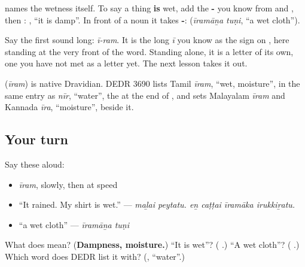 \textbf{} names the wetness itself. To say a thing \textbf{is} wet, add the \textbf{-} you know from \textbf{} and \textbf{}, then \textbf{}: \textbf{ }, \textquotedblleft{}it is damp\textquotedblright{}. In front of a noun it takes \textbf{-}: \textbf{ } (\emph{īramāṉa tuṇi}, \textquotedblleft{}a wet cloth\textquotedblright{}).

Say the first sound long: \emph{ī-ram}. It is the long \emph{ī} you know as the sign  on \textbf{}, here standing at the very front of the word. Standing alone, it is a letter of its own, one you have not met as a letter yet. The next lesson takes it out.

\begin{cousinweb}
\textbf{} (\emph{īram}) is native Dravidian. DEDR 3690 lists Tamil \emph{īram}, \textquotedblleft{}wet, moisture\textquotedblright{}, in the same entry as \emph{nīr}, \textquotedblleft{}water\textquotedblright{}, the \textbf{} at the end of \textbf{}, and sets Malayalam \emph{īram} and Kannada \emph{īra}, \textquotedblleft{}moisture\textquotedblright{}, beside it.
\end{cousinweb}

\subsection*{Your turn}
Say these aloud:

\begin{itemize}
\raggedright
  \item \emph{īram}, slowly, then at speed
  \item \textquotedblleft{}It rained. My shirt is wet.\textquotedblright{} — \emph{maḻai peytatu. eṉ caṭṭai īramāka irukkiṟatu.}
  \item \textquotedblleft{}a wet cloth\textquotedblright{} — \emph{īramāṉa tuṇi}
\end{itemize}

\begin{tcolorbox}[breakable,colback=teal!4,colframe=teal!35!black,title={Before you move on}]
What does \textbf{} mean? (\textbf{Dampness, moisture.}) \textquotedblleft{}It is wet\textquotedblright{}? (\textbf{ }.) \textquotedblleft{}A wet cloth\textquotedblright{}? (\textbf{ }.) Which word does DEDR list it with? (\textbf{}, \textquotedblleft{}water\textquotedblright{}.)
\end{tcolorbox}
